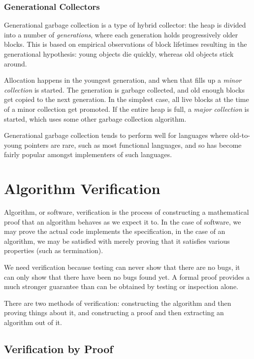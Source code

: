 \subsubsection{Generational Collectors}

Generational garbage collection is a type of hybrid collector: the
heap is divided into a number of \textit{generations}, where each
generation holds progressively older blocks. This is based on
empirical observations of block lifetimes resulting in the
generational hypothesis: young objects die quickly, whereas old
objects stick around\cite{Ungar84}.

Allocation happens in the youngest generation, and when that fills up
a \textit{minor collection} is started. The generation is garbage
collected, and old enough blocks get copied to the next generation. In
the simplest case, all live blocks at the time of a minor collection
get promoted. If the entire heap is full, a \textit{major collection}
is started, which uses some other garbage collection
algorithm\cite{GarbageCollection}.

Generational garbage collection tends to perform well for languages
where old-to-young pointers are rare, such as most functional
languages, and so has become fairly popular amongst implementers of
such languages.

\section{Algorithm Verification}

Algorithm, or software, verification is the process of constructing a
mathematical proof that an algorithm behaves as we expect it to. In
the case of software, we may prove the actual code implements the
specification, in the case of an algorithm, we may be satisfied with
merely proving that it satisfies various properties (such as
termination).

We need verification because testing can never show that there are no
bugs, it can only show that there have been no bugs found yet. A
formal proof provides a much stronger guarantee than can be obtained
by testing or inspection alone.

There are two methods of verification: constructing the algorithm and
then proving things about it, and constructing a proof and then
extracting an algorithm out of it.

\subsection{Verification by Proof}

